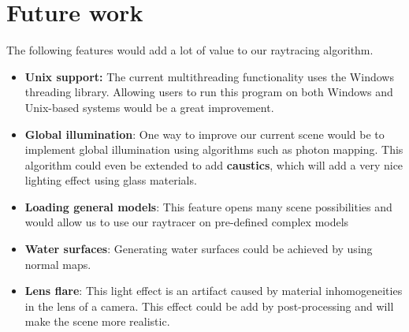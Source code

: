 \section*{Future work}
The following features would add a lot of value to our raytracing algorithm.

\begin{itemize}
\item \textbf{Unix support:} The current multithreading functionality uses the Windows threading library. Allowing users to run this program on both Windows and Unix-based systems would be a great improvement.
\item \textbf{Global illumination}: One way to improve our current scene would be to implement global illumination using algorithms such as photon mapping. This algorithm could even be extended to add \textbf{caustics}, which will add a very nice lighting effect using glass materials.
\item \textbf{Loading general models}: This feature opens many scene possibilities and would allow us to use our raytracer on pre-defined complex models
\item \textbf{Water surfaces}: Generating water surfaces could be achieved by using normal maps.
\item \textbf{Lens flare}: This light effect is an artifact caused by material inhomogeneities in the lens of a camera. This effect could be add by post-processing and will make the scene more realistic.
\end{itemize}
